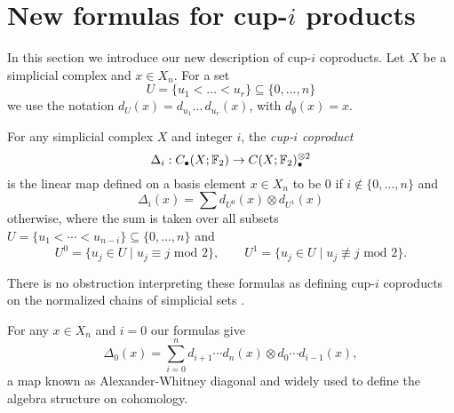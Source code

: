 
\section{New formulas for cup-$i$ products} \label{s:formulas}

In this section we introduce our new description of cup-$i$ coproducts.
Let $X$ be a simplicial complex and $x \in X_n$.
For a set
\begin{equation*}
U = \{u_1 < \dots < u_r\} \subseteq \{0, \dots, n\}
\end{equation*}
we use the notation $d_U(x) = d_{u_1} \ldots\, d_{u_r}(x)$, with $d_{\emptyset}(x) = x$.

\begin{definition} \label{d:cup-i coproducts}	
	For any simplicial complex $X$ and integer $i$, the \textit{cup-$i$ coproduct}
	\begin{equation*}
	\Delta_i : C_\bullet(X; \mathbb{F}_2) \to C(X; \mathbb{F}_2)^{\otimes 2}_\bullet
	\end{equation*}
	is the linear map defined on a basis element $x \in X_n$ to be $0$ if $i \not\in \{0, \dots, n\}$ and
	\begin{equation} \label{equation: simplicial cup-i coproducts}
	\Delta_i(x) = \sum d_{U^0}(x) \otimes d_{U^1}(x)
	\end{equation}
	otherwise, where the sum is taken over all subsets $U = \{u_1 < \cdots < u_{n-i}\} \subseteq \{0, \dots, n\}$ and
	\begin{equation*}
	U^0 = \{u_j \in U\mid u_j \equiv j \text{ mod } 2\}, \qquad
	U^1 = \{u_j \in U\mid u_j \not\equiv j \text{ mod } 2\}.
	\end{equation*}
\end{definition}

\begin{remark}
	There is no obstruction interpreting these formulas as defining cup-$i$ coproducts on the normalized chains of simplicial sets \cite{friedman2012simplicial}.
\end{remark}

\begin{example}
	For any $x \in X_n$ and $i = 0$ our formulas give
	\begin{equation*}
	\Delta_0(x) = \sum_{i=0}^n d_{i+1} \cdots d_{n}(x) \otimes d_{0} \cdots d_{i-1}(x),
	\end{equation*}
	a map known as Alexander-Whitney diagonal and widely used to define the algebra structure on cohomology.
\end{example}

